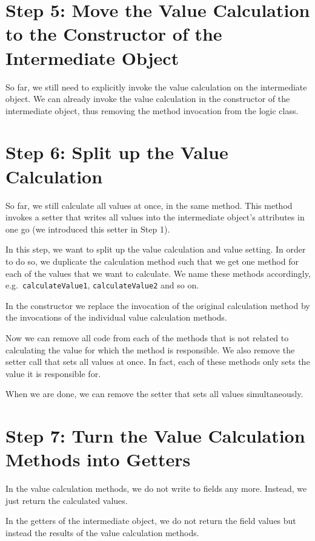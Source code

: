 \documentclass[a4paper,fleqn,titlepage,11pt]{article}
\begin{document}
\section{Step 5: Move the Value Calculation to the Constructor of the Intermediate Object}

So far, we still need to explicitly invoke the value calculation on the intermediate object. We can already invoke the value calculation in the constructor of the intermediate object, thus removing the method invocation from the logic class.

\section{Step 6: Split up the Value Calculation}

So far, we still calculate all values at once, in the same method. This method invokes a setter that writes all values into the intermediate object's attributes in one go (we introduced this setter in Step 1).

In this step, we want to split up the value calculation and value setting. In order to do so, we duplicate the calculation method such that we get one method for each of the values that we want to calculate. We name these methods accordingly, e.g.~\texttt{calculateValue1}, \texttt{calculateValue2} and so on.

In the constructor we replace the invocation of the original calculation method by the invocations of the individual value calculation methods.

Now we can remove all code from each of the methods that is not related to calculating the value for which the method is responsible. We also remove the setter call that sets all values at once. In fact, each of these methods only sets the value it is responsible for.

When we are done, we can remove the setter that sets all values simultaneously.

\section{Step 7: Turn the Value Calculation Methods into Getters}

In the value calculation methods, we do not write to fields any more. Instead, we just return the calculated values.

In the getters of the intermediate object, we do not return the field values but instead the results of the value calculation methods.
\end{document}
